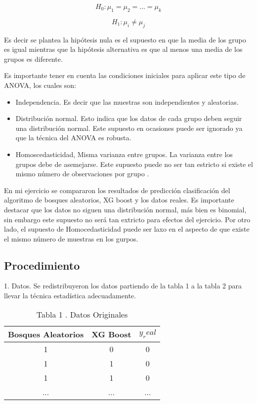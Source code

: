 \documentclass{article}
\begin{document}
$$H_0: \mu_1 = \mu_2 = ... = \mu_k$$

$$H_1: \mu_i \neq \mu_j$$

Es decir se plantea la hipótesis nula es el supuesto en que la media de los grupo es igual mientras que la hipótesis alternativa es que al menos una media de los grupos es diferente.

Es importante tener en cuenta las condiciones iniciales para aplicar este tipo de ANOVA, los cuales son:

\begin{itemize}
    \item Independencia. Es decir que las muestras son independientes y aleatorias.
    \item Distribución normal. Esto indica que los datos de cada grupo deben seguir una distribución normal. Este supuesto en ocasiones puede ser ignorado ya que la técnica del ANOVA es robusta.
    \item Homoscedasticidad, Misma varianza entre grupos. La varianza entre los grupos debe de asemejarse. Este supuesto puede no ser tan estricto si existe el mismo número de observaciones por grupo \cite{Amat}.
\end{itemize}


En mi ejercicio se compararon los resultados de predicción clasificación del algoritmo de bosques aleatorios, XG boost y los datos reales. Es importante destacar que los datos no siguen una distribución normal, más bien es binomial, sin embargo este supuesto no será tan extricto para efectos del ejercicio. Por otro lado, el supuesto de Homocedasticidad puede ser laxo en el aspecto de que existe el mismo número de muestras en los gurpos.


\subsection{Procedimiento}

1. Datos. Se redistribuyeron los datos partiendo de la tabla 1 a la tabla 2 para llevar la técnica estadística adecuadamente.


\begin{table}[hbt!]
\begin{center}
\begin{tabular}{| c | c |c|}
\hline
Bosques Aleatorios & XG Boost & $y_real$ \\ \hline
1 & 0 & 0 \\
1 & 1 & 0 \\
1 & 1 & 0 \\ 
... & ... & ...\\
\hline
\end{tabular}
\caption{Tabla 1 . Datos Originales}
\label{tab:fruta}
\end{center}
\end{table}
\end{document}
